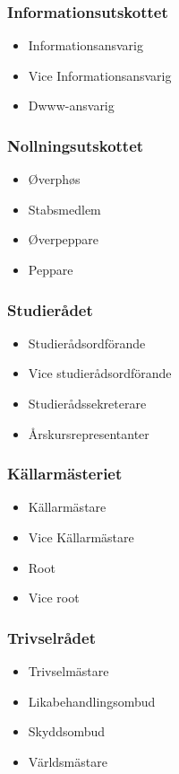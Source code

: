 \documentclass{dsekprotokoll}
\begin{document}
\begin{multicols}{2}
  \subsubsection*{Informationsutskottet}
  \begin{itemize}
    \item Informationsansvarig
    \item Vice Informationsansvarig
    \item Dwww-ansvarig
  \end{itemize}
  \subsubsection*{Nollningsutskottet}
  \begin{itemize}
    \item Øverphøs
    \item Stabsmedlem
    \item \O verpeppare
    \item Peppare
  \end{itemize}
  \subsubsection*{Studierådet}
  \begin{itemize}
    \item Studierådsordförande
    \item Vice studierådsordförande
    \item Studierådssekreterare
    \item Årskursrepresentanter
  \end{itemize}
  \subsubsection*{Källarmästeriet}
  \begin{itemize}
    \item Källarmästare
    \item Vice Källarmästare
    \item Root
    \item Vice root
  \end{itemize}
  \subsubsection*{Trivselrådet}
  \begin{itemize}
    \item Trivselmästare
    \item Likabehandlingsombud
    \item Skyddsombud
    \item Världsmästare
  \end{itemize}

\end{multicols}
\end{document}
